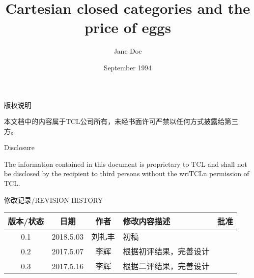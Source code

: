 \documentclass[10pt,a4paper,titlepage]{article} %
\title{Cartesian closed categories and the price of eggs}
\author{Jane Doe}
\date{September 1994}
\begin{document}
\begin{center}
    \par 版权说明
    \par 本文档中的内容属于TCL公司所有，未经书面许可严禁以任何方式披露给第三方。
    \vspace{2ex}
    \par Disclosure
    \par The information contained in this document is proprietary to TCL and shall not be disclosed by the recipient to third persons without the wriTCLn permission of TCL.
    \vspace{2ex}
    \par 修改记录/REVISION HISTORY
    \vspace{2ex}

    \begin{tabular}{|c|c|c|p{150pt}|c|}
        \hline
        版本/状态 & 日期 & 作者 & 修改内容描述 & 批准\\  %
        \hline
        0.1 & 2018.5.03 & 刘礼丰 & 初稿 & \\
        \hline
        0.2 & 2017.5.07 & 李辉 & 根据初评结果，完善设计 & \\
        \hline
        0.3 & 2017.5.16 & 李辉 & 根据二评结果，完善设计 & \\
        \hline
    \end{tabular}
\end{center}
\end{document}
